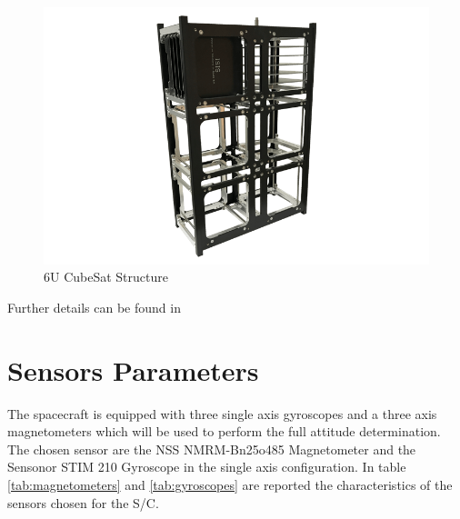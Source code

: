 \documentclass[11pt,a4paper]{report}
\begin{document}
\begin{figure}[H]
 	\centering
 	\includegraphics[scale=0.3]{gfx/structure.png}
    \caption{6U CubeSat Structure}
\end{figure}

Further details can be found in \cite{Ref:DataSheets:Structure}

\section{Sensors Parameters}
The spacecraft is equipped with three single axis gyroscopes and a three axis magnetometers which will be used to perform the full attitude determination.
The chosen sensor are the NSS NMRM-Bn25o485 Magnetometer and the Sensonor STIM 210 Gyroscope in the single axis configuration.
In table \ref{tab:magnetometers} and \ref{tab:gyroscopes} are reported the characteristics of the sensors chosen for the S/C.
\end{document}
